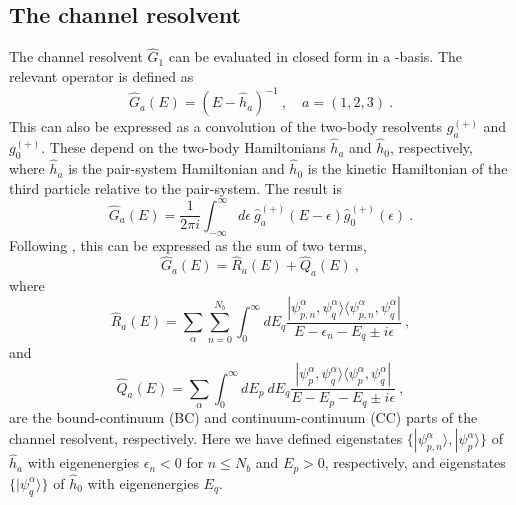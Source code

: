 \documentclass[aps,prc,showpacs,twocolumn,floatfix,nobibnotes,nofootinbib,amsmath,amssymb,longbibliography]{revtex4-2}
\begin{document}
\subsection{The channel resolvent}
\label{app | channel resolvent}
The channel resolvent $\hat{G}_1$ can be evaluated in closed form in a
\swp{}-basis. The relevant operator is defined as
\begin{equation}
	\hat{G}_a(E) = (E - \hat{h}_a)^{-1} \:,\quad a=(1,2,3) \:.
\end{equation}
This can also be expressed as a convolution
\cite{bianchi1964convolution} of the two-body resolvents $g_a^{(+)}$
and $g_0^{(+)}$. These depend on the two-body Hamiltonians $\hat{h}_a$
and $\hat{h}_0$, respectively, where $\hat{h}_a$ is the pair-system
Hamiltonian and $\hat{h}_0$ is the kinetic Hamiltonian of the third
particle relative to the pair-system. The result is
\begin{equation}
	\hat{G}_a(E) = \frac{1}{2\pi i}\int_{-\infty}^{\infty} d\epsilon\:\hat{g}_a^{(+)}(E-\epsilon)\hat{g}_0^{(+)}(\epsilon) \:.
\end{equation}
Following \cite{kukulin2007wave}, this can be expressed as the sum of two terms,
\begin{equation}
	\hat{G}_a(E) = \hat{R}_a(E) + \hat{Q}_a(E) \:,
	\label{eq | resovlent post-convolution}
\end{equation}
where
\begin{equation}
	\hat{R}_a(E) = \sum_{\alpha}\sum_{n=0}^{N_b} \int_0^\infty dE_q \frac{|\psi_{p,n}^\alpha, \psi_q^\alpha\rangle\langle \psi_{p,n}^\alpha, \psi_q^\alpha|}{E - \epsilon_n - E_q \pm i\epsilon} \:,
\end{equation}
and
\begin{equation}
	\hat{Q}_a(E) = \sum_{\alpha} \int_0^\infty dE_p\:dE_q \frac{|\psi_p^\alpha, \psi_q^\alpha\rangle\langle \psi_p^\alpha, \psi_q^\alpha|}{E - E_p - E_q \pm i\epsilon} \:,
\end{equation}
are the bound-continuum (BC) and continuum-continuum (CC) parts of the
channel resolvent, respectively. Here we have defined eigenstates
$\{|\psi_{p,n}^\alpha\rangle, |\psi_p^\alpha\rangle\}$ of $\hat{h}_a$
with eigenenergies $\epsilon_n<0$ for $n\leq N_b$ and $E_p>0$,
respectively, and eigenstates $\{|\psi_q^\alpha\rangle\}$ of
$\hat{h}_0$ with eigenenergies $E_q$.
\end{document}

